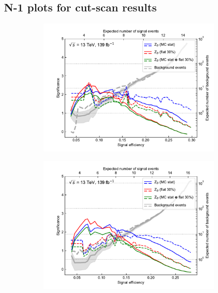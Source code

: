 
\chapter{}
\section{N-1 plots for cut-scan results}\label{app:n-1_plots_cut_opt}

\ifpdf
\graphicspath{{chapter-optimisation/Figs/Raster/}{chapter-electroweak/Figs/PDF/}{chapter-optimisation/Figs/}}
\else
\graphicspath{{chapter-optimisation/Figs/Vector/}{chapter-electroweak/Figs/}}
\fi

\begin{figure}
	\centering
	\begin{subfigure}[b]{0.5\linewidth}
		\centering\includegraphics[width=1.0\textwidth]{N-1_cut_scan/z_vs_effs_800_150.pdf}
		\caption{}
	\end{subfigure}\hfill
	\begin{subfigure}[b]{0.5\linewidth}
		\centering\includegraphics[width=1.0\textwidth]{N-1_cut_scan/z_vs_effs_800_0.pdf}

\end{subfigure}
\end{figure}
